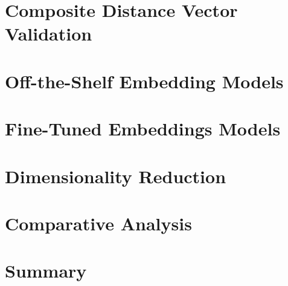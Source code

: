 \section{Composite Distance Vector Validation}

\section{Off-the-Shelf Embedding Models}

\section{Fine-Tuned Embeddings Models}

\section{Dimensionality Reduction}

\section{Comparative Analysis}

\section{Summary}